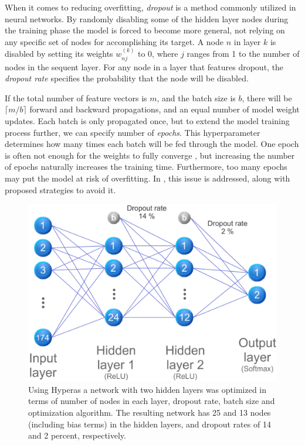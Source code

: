 When it comes to reducing overfitting, \emph{dropout} is a method commonly utilized in neural networks. By randomly disabling some of the hidden layer nodes during the training phase the model is forced to become more general, not relying on any specific set of nodes for accomplishing its target. A node $n$ in layer $k$ is disabled by setting its weights $w^{(k)}_{nj}$ to 0, where $j$ ranges from 1 to the number of nodes in the sequent layer. For any node in a layer that features dropout, the \emph{dropout rate} specifies the probability that the node will be disabled.

If the total number of feature vectors is $m$, and the batch size is $b$, there will be $\lceil m/b \rceil$ forward and backward propagations, and an equal number of model weight updates. Each batch is only propagated once, but to extend the model training process further, we can specify number of \emph{epochs}. This hyperparameter determines how many times each batch will be fed through the model. One epoch is often not enough for the weights to fully converge \citep{kriesel_2007}, but increasing the number of epochs naturally increases the training time. Furthermore, too many epochs may put the model at risk of overfitting. In \citep{prechelt_2000}, this issue is addressed, along with proposed strategies to avoid it.

\begin{figure}[h]
	\centering
	\includegraphics[scale=0.5]{figs_temp/optimized_network_graph.jpg}
	\caption{Using Hyperas a network with two hidden layers was optimized in terms of number of nodes in each layer, dropout rate, batch size and optimization algorithm. The resulting network has 25 and 13 nodes (including bias terms) in the hidden layers, and dropout rates of 14 and 2 percent, respectively.}
	\label{fig:opt_net}
\end{figure}

